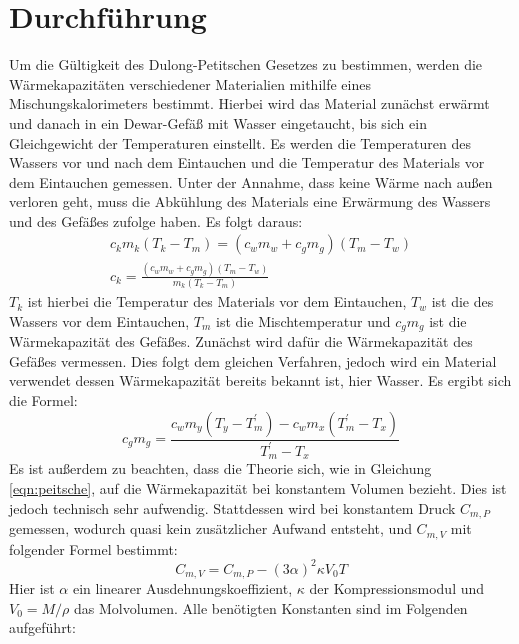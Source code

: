 \section{Durchführung}
\label{sec:Durchführung}
Um die Gültigkeit des Dulong-Petitschen Gesetzes zu bestimmen, werden die Wärmekapazitäten 
verschiedener Materialien
mithilfe eines Mischungskalorimeters bestimmt.
Hierbei wird das Material zunächst erwärmt und danach in ein Dewar-Gefäß mit Wasser eingetaucht,
bis sich ein Gleichgewicht der Temperaturen einstellt.
Es werden die Temperaturen des Wassers vor und nach dem Eintauchen und die Temperatur des Materials vor dem Eintauchen gemessen.
Unter der Annahme, dass keine Wärme nach außen verloren geht,
muss die Abkühlung des Materials eine Erwärmung des Wassers und des Gefäßes zufolge haben.
Es folgt daraus:
\begin{gather}
    c_km_k(T_k-T_m) = (c_wm_w + c_gm_g)(T_m - T_w) \\
    \label{eq:wkap}
    c_k = \frac{(c_wm_w + c_gm_g)(T_m - T_w)}{m_k(T_k - T_m)}
\end{gather}
$T_k$ ist hierbei die Temperatur des Materials vor dem Eintauchen, $T_w$ ist die des Wassers vor dem Eintauchen,
$T_m$ ist die Mischtemperatur und $c_gm_g$ ist die Wärmekapazität des Gefäßes.
Zunächst wird dafür die Wärmekapazität des Gefäßes vermessen. Dies folgt dem gleichen 
Verfahren, jedoch wird ein Material verwendet
dessen Wärmekapazität bereits bekannt ist, hier Wasser.
Es ergibt sich die Formel:
\begin{equation}
    \label{eqn:gefaess}
    c_gm_g = \frac{c_wm_y\left(T_y - T^{\prime}_m\right) - c_wm_x\left(T^{\prime}_m - T_x\right)}{T^{\prime}_m - T_x}
\end{equation}
Es ist außerdem zu beachten, dass die Theorie sich, wie in Gleichung \eqref{eqn:peitsche},
auf die Wärmekapazität bei konstantem Volumen bezieht.
Dies ist jedoch technisch sehr aufwendig. Stattdessen wird bei konstantem Druck $C_{m,P}$ gemessen,
wodurch quasi kein zusätzlicher Aufwand entsteht, und $C_{m,V}$ mit folgender Formel bestimmt:
\begin{equation}
    \label{eqn:konstv}
    C_{m,V} = C_{m,P} - (3\alpha)^2\kappa V_0T
\end{equation}
Hier ist $\alpha$ ein linearer Ausdehnungskoeffizient, $\kappa$ der Kompressionsmodul und \mbox{$V_0=M/\rho$} das Molvolumen.
Alle benötigten Konstanten sind im Folgenden aufgeführt:
